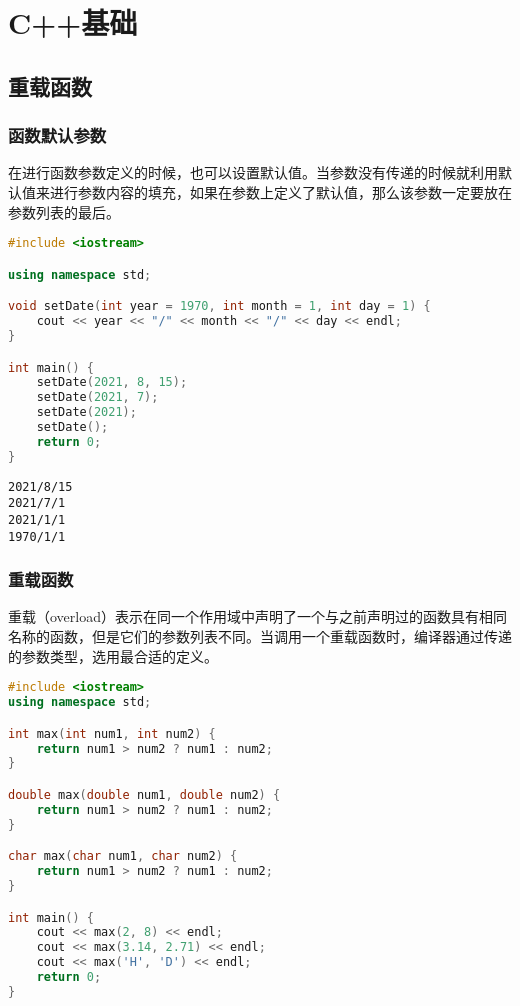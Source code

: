 \chapter{C++基础}

\section{重载函数}

\subsection{函数默认参数}

在进行函数参数定义的时候，也可以设置默认值。当参数没有传递的时候就利用默认值来进行参数内容的填充，如果在参数上定义了默认值，那么该参数一定要放在参数列表的最后。\\


\begin{lstlisting}[language=C++]
#include <iostream>

using namespace std;

void setDate(int year = 1970, int month = 1, int day = 1) {
    cout << year << "/" << month << "/" << day << endl;
}

int main() {
    setDate(2021, 8, 15);
    setDate(2021, 7);
    setDate(2021);
    setDate();
    return 0;
}
\end{lstlisting}

\begin{tcolorbox}
	\begin{verbatim}
2021/8/15
2021/7/1
2021/1/1
1970/1/1
	\end{verbatim}
\end{tcolorbox}

\vspace{0.5cm}

\subsection{重载函数}

重载（overload）表示在同一个作用域中声明了一个与之前声明过的函数具有相同名称的函数，但是它们的参数列表不同。当调用一个重载函数时，编译器通过传递的参数类型，选用最合适的定义。\\


\begin{lstlisting}[language=C++]
#include <iostream>
using namespace std;

int max(int num1, int num2) {
    return num1 > num2 ? num1 : num2;
}

double max(double num1, double num2) {
    return num1 > num2 ? num1 : num2;
}

char max(char num1, char num2) {
    return num1 > num2 ? num1 : num2;
}

int main() {
    cout << max(2, 8) << endl;
    cout << max(3.14, 2.71) << endl;
    cout << max('H', 'D') << endl;
    return 0;
}
\end{lstlisting}


